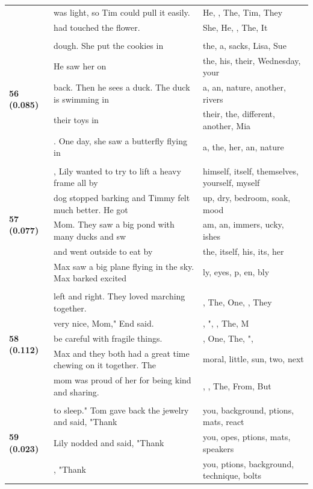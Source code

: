 \documentclass{article}
\theoremstyle{plain}
\theoremstyle{definition}
\theoremstyle{remark}
\begin{document}
\begin{longtable}{|p{}|p{}|p{}|}
& was light, so Tim could pull it easily. & He,  ,  The,  Tim,  They \\
& had touched the flower. & She,  He,   ,  The,  It \\
& & \\
\multirow{5}{*}{\textbf{56 (0.085)}} & dough. She put the cookies in & the,  a,  sacks,  Lisa,  Sue \\
& He saw her on & the,  his,  their,  Wednesday,  your \\
& back.  Then he sees a duck. The duck is swimming in & a,  an,  nature,  another,  rivers \\
& their toys in & their,  the,  different,  another,  Mia \\
& . One day, she saw a butterfly flying in & a,  the,  her,  an,  nature \\
& & \\
\multirow{5}{*}{\textbf{57 (0.077)}} & , Lily wanted to try to lift a heavy frame all by & himself,  itself,  themselves,  yourself,  myself \\
& dog stopped barking and Timmy felt much better. He got & up,  dry,  bedroom,  soak,  mood \\
& Mom. They saw a big pond with many ducks and sw & am, an, immers, ucky, ishes \\
& and went outside to eat by & the,  itself,  his,  its,  her \\
& Max saw a big plane flying in the sky.  Max barked excited & ly,  eyes,  p, en, bly \\
& & \\
\multirow{5}{*}{\textbf{58 (0.112)}} & left and right. They loved marching together. & , The, One,  , They \\
& very nice, Mom," End said. & , ",  , The, M \\
& be careful with fragile things. & , One, The, ", \\
& Max and they both had a great time chewing on it together. The & moral,  little,  sun,  two,  next \\
& mom was proud of her for being kind and sharing. & ,  , The, From, But \\
& & \\
\multirow{5}{*}{\textbf{59 (0.023)}} & to sleep." Tom gave back the jewelry and said, "Thank & you,  background, ptions,  mats,  react \\
& Lily nodded and said, "Thank & you, opes, ptions,  mats,  speakers \\
& , "Thank & you, ptions,  background,  technique,  bolts \\

\end{longtable}
\end{document}
